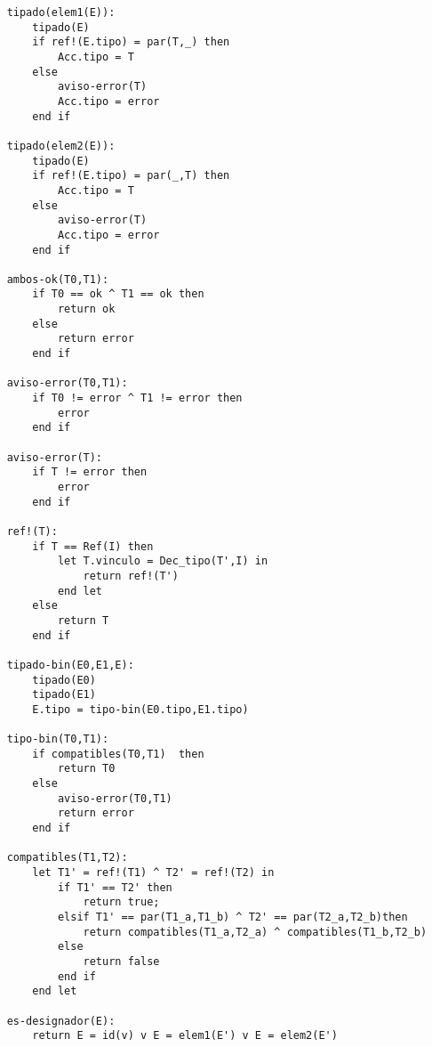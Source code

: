 \begin{lstlisting}
    tipado(elem1(E)):
        tipado(E)
        if ref!(E.tipo) = par(T,_) then
            Acc.tipo = T
        else
            aviso-error(T)
            Acc.tipo = error
        end if

    tipado(elem2(E)):
        tipado(E)
        if ref!(E.tipo) = par(_,T) then
            Acc.tipo = T
        else
            aviso-error(T)
            Acc.tipo = error
        end if

    ambos-ok(T0,T1):
        if T0 == ok ^ T1 == ok then
            return ok
        else 
            return error
        end if

    aviso-error(T0,T1):
        if T0 != error ^ T1 != error then
            error
        end if

    aviso-error(T):
        if T != error then
            error
        end if 

    ref!(T):
        if T == Ref(I) then
            let T.vinculo = Dec_tipo(T',I) in
                return ref!(T')
            end let
        else
            return T
        end if

    tipado-bin(E0,E1,E):
        tipado(E0)
        tipado(E1)
        E.tipo = tipo-bin(E0.tipo,E1.tipo)

    tipo-bin(T0,T1):
        if compatibles(T0,T1)  then
            return T0
        else
            aviso-error(T0,T1)
            return error
        end if

    compatibles(T1,T2):
        let T1' = ref!(T1) ^ T2' = ref!(T2) in
            if T1' == T2' then
                return true;
            elsif T1' == par(T1_a,T1_b) ^ T2' == par(T2_a,T2_b)then
                return compatibles(T1_a,T2_a) ^ compatibles(T1_b,T2_b)
            else
                return false
            end if
        end let

    es-designador(E):
        return E = id(v) v E = elem1(E') v E = elem2(E')

\end{lstlisting}
